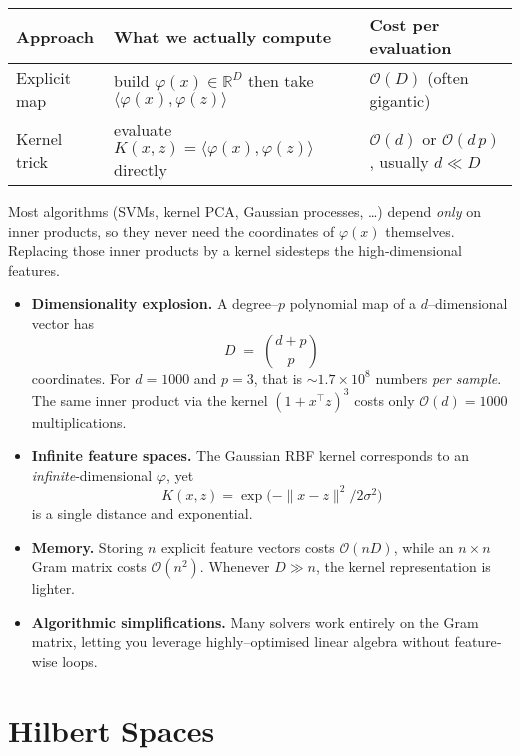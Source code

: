 \begin{center}
\begin{tabular}{|l|p{5.6cm}|l|}
\hline
\textbf{Approach} & \textbf{What we actually compute} & \textbf{Cost per evaluation}\\
\hline
Explicit map & build $\varphi(x)\in\mathbb{R}^{D}$ then take $\langle\varphi(x),\varphi(z)\rangle$ & $\mathcal{O}(D)$ (often gigantic)\\
Kernel trick & evaluate $K(x,z)=\langle\varphi(x),\varphi(z)\rangle$ directly & $\mathcal{O}(d)$ or $\mathcal{O}(d\,p)$, usually $d\ll D$\\
\hline
\end{tabular}
\end{center}

Most algorithms (SVMs, kernel PCA, Gaussian processes, \dots) depend \emph{only} on inner products, so they never need the coordinates of $\varphi(x)$ themselves.  Replacing those inner products by a kernel sidesteps the high‐dimensional features.

\begin{itemize}
  \item \textbf{Dimensionality explosion.}  
        A degree–$p$ polynomial map of a $d$–dimensional vector has
        \[
            D \;=\; \binom{d+p}{p}
        \]
        coordinates.  For $d=1000$ and $p=3$, that is $\sim1.7\times10^{8}$ numbers \emph{per sample}.  
        The same inner product via the kernel $(1+x^{\top}z)^{3}$ costs only $\mathcal{O}(d)=1000$ multiplications.
  \item \textbf{Infinite feature spaces.}  
        The Gaussian RBF kernel corresponds to an \emph{infinite}‐dimensional $\varphi$, yet
        \[
            K(x,z)=\exp\!\bigl(-\|x-z\|^{2}/2\sigma^{2}\bigr)
        \]
        is a single distance and exponential.
  \item \textbf{Memory.}  
        Storing $n$ explicit feature vectors costs $\mathcal{O}(nD)$, while an $n\times n$ Gram matrix costs $\mathcal{O}(n^{2})$.  
        Whenever $D\gg n$, the kernel representation is lighter.
  \item \textbf{Algorithmic simplifications.}  
        Many solvers work entirely on the Gram matrix, letting you leverage highly–optimised linear algebra without feature‐wise loops.
\end{itemize}


\section{Hilbert Spaces}


